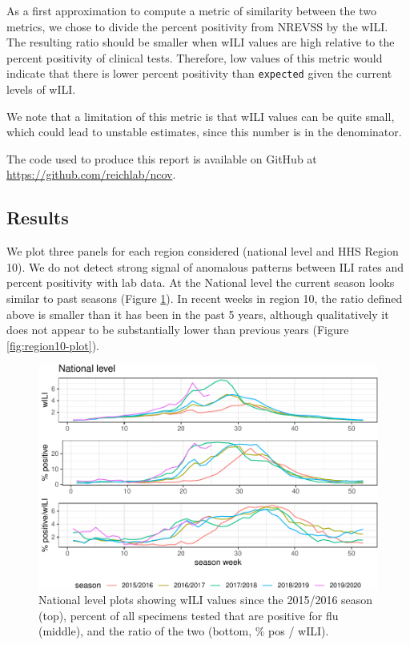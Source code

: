 \documentclass[]{article}
\begin{document}
As a first approximation to compute a metric of similarity between the
two metrics, we chose to divide the percent positivity from NREVSS by
the wILI. The resulting ratio should be smaller when wILI values are
high relative to the percent positivity of clinical tests. Therefore,
low values of this metric would indicate that there is lower percent
positivity than \texttt{expected} given the current levels of wILI.

We note that a limitation of this metric is that wILI values can be
quite small, which could lead to unstable estimates, since this number
is in the denominator.

The code used to produce this report is available on GitHub at
\url{https://github.com/reichlab/ncov}.

\hypertarget{results}{%
\subsection{Results}\label{results}}

We plot three panels for each region considered (national level and HHS
Region 10). We do not detect strong signal of anomalous patterns between
ILI rates and percent positivity with lab data. At the National level
the current season looks similar to past seasons (Figure
\ref{fig:national-plot}). In recent weeks in region 10, the ratio
defined above is smaller than it has been in the past 5 years, although
qualitatively it does not appear to be substantially lower than previous
years (Figure \ref{fig:region10-plot}).

\begin{figure}
\centering
\includegraphics{ili-labtest-report_files/figure-latex/national-plot-1.pdf}
\caption{\label{fig:national-plot}National level plots showing wILI
values since the 2015/2016 season (top), percent of all specimens tested
that are positive for flu (middle), and the ratio of the two (bottom, \%
pos / wILI).}
\end{figure}
\end{document}
